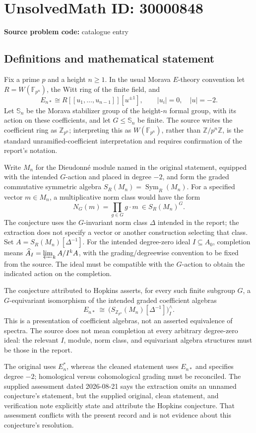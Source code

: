 \documentclass[11pt]{article}
\newcommand{\Z}{\mathbb{Z}}
\newcommand{\F}{\mathbb{F}}
\begin{document}
\section*{UnsolvedMath ID: 30000848}
\textbf{Source problem code:} catalogue entry
\subsection{Definitions and mathematical statement}
Fix a prime \(p\) and a height \(n\geq1\). In the usual Morava \(E\)-theory convention let \(R=W(\F_{p^n})\), the Witt ring of the finite field, and
\[
 E_{n*}\cong R[[u_1,\ldots,u_{n-1}]][u^{\pm1}],
 \qquad |u_i|=0,\quad |u|=-2.
\]
Let \(\mathbb S_n\) be the Morava stabilizer group of the height-\(n\) formal group, with its action on these coefficients, and let \(G\leq\mathbb S_n\) be finite. The source writes the coefficient ring as \(\mathbb Z_{p^n}\); interpreting this as \(W(\F_{p^n})\), rather than \(\Z/p^n\Z\), is the standard unramified-coefficient interpretation and requires confirmation of the report's notation.

Write \(M_n\) for the Dieudonn\'e module named in the original statement, equipped with the intended \(G\)-action and placed in degree \(-2\), and form the graded commutative symmetric algebra \(S_R(M_n)=\operatorname{Sym}_R(M_n)\). For a specified vector \(m\in M_n\), a multiplicative norm class would have the form
\[
 N_G(m)=\prod_{g\in G}g\cdot m\ \in S_R(M_n)^G.
\]
The conjecture uses the \(G\)-invariant norm class \(\Delta\) intended in the report; the extraction does not specify a vector or another construction selecting that class. Set \(A=S_R(M_n)[\Delta^{-1}]\). For the intended degree-zero ideal \(I\subseteq A_0\), completion means \(\widehat A_I=\varprojlim_k A/I^kA\), with the grading/degreewise convention to be fixed from the source. The ideal must be compatible with the \(G\)-action to obtain the indicated action on the completion.

The conjecture attributed to Hopkins asserts, for every such finite subgroup \(G\), a \(G\)-equivariant isomorphism of the intended graded coefficient algebras
\[
 E_{n*}\ \cong\ \bigl(S_{\mathbb Z_{p^n}}(M_n)[\Delta^{-1}]\bigr)^{\wedge}_I.
\]
This is a presentation of coefficient algebras, not an asserted equivalence of spectra. The source does not mean completion at every arbitrary degree-zero ideal: the relevant \(I\), module, norm class, and equivariant algebra structures must be those in the report.

The original uses \(E_n^*\), whereas the cleaned statement uses \(E_{n*}\) and specifies degree \(-2\); homological versus cohomological grading must be reconciled. The supplied assessment dated 2026-08-21 says the extraction omits an unnamed conjecture's statement, but the supplied original, clean statement, and verification note explicitly state and attribute the Hopkins conjecture. That assessment conflicts with the present record and is not evidence about this conjecture's resolution.
\end{document}
